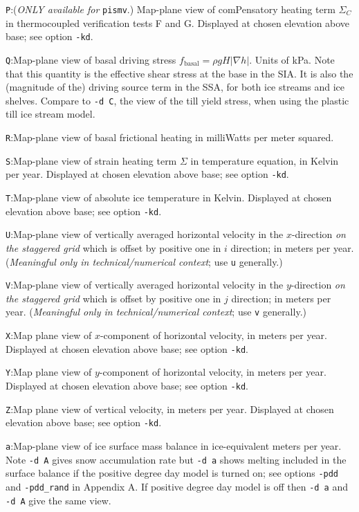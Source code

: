 \documentclass[11pt,final]{amsart}
\renewcommand{\t}[1]{\texttt{#1}}
\newcommand{\grad}{\nabla}
\begin{document}
\verb|P|:\quad \notMat (\emph{ONLY available for }\t{pismv}.)  Map-plane view of comPensatory heating term $\Sigma_C$ in thermocoupled verification tests F and G.  Displayed at chosen elevation above base; see option \verb|-kd|.

\verb|Q|:\quad Map-plane view of basal driving stress $f_{\text{basal}} = \rho g H |\grad h|$.  Units of kPa.  Note that this quantity is the effective shear stress at the base in the SIA.  It is also the (magnitude of the) driving source term in the SSA, for both ice streams and ice shelves.  Compare to \verb|-d C|, the view of the till yield stress, when using the plastic till ice stream model.

\verb|R|:\quad Map-plane view of basal frictional heating in milliWatts per meter squared.

\verb|S|:\quad Map-plane view of strain heating term $\Sigma$ in temperature equation, in Kelvin per year.  Displayed at chosen elevation above base; see option \verb|-kd|.

\verb|T|:\quad Map-plane view of absolute ice temperature in Kelvin.  Displayed at chosen elevation above base; see option \verb|-kd|.

\verb|U|:\quad Map-plane view of vertically averaged horizontal velocity in the $x$-direction \emph{on the staggered grid} which is offset by positive one in $i$ direction;  in meters per year.  (\emph{Meaningful only in technical/numerical context}; use \verb|u| generally.)

\verb|V|:\quad Map-plane view of vertically averaged horizontal velocity in the $y$-direction \emph{on the staggered grid} which is offset by positive one in $j$ direction;  in meters per year.  (\emph{Meaningful only in technical/numerical context}; use \verb|v| generally.)

\verb|X|:\quad Map plane view of $x$-component of horizontal velocity, in meters per year.  Displayed at chosen elevation above base; see option \verb|-kd|.

\verb|Y|:\quad Map plane view of $y$-component of horizontal velocity, in meters per year.  Displayed at chosen elevation above base; see option \verb|-kd|.

\verb|Z|:\quad Map plane view of vertical velocity, in meters per year.  Displayed at chosen elevation above base; see option \verb|-kd|.

\verb|a|:\quad Map-plane view of ice surface mass balance in ice-equivalent meters per year.  Note \verb|-d A| gives snow accumulation rate but \verb|-d a| shows melting included in the surface balance if the positive degree day model is turned on; see options \verb|-pdd| and \verb|-pdd_rand| in Appendix A.  If positive degree day model is off then \verb|-d a| and \verb|-d A| give the same view.
\end{document}
